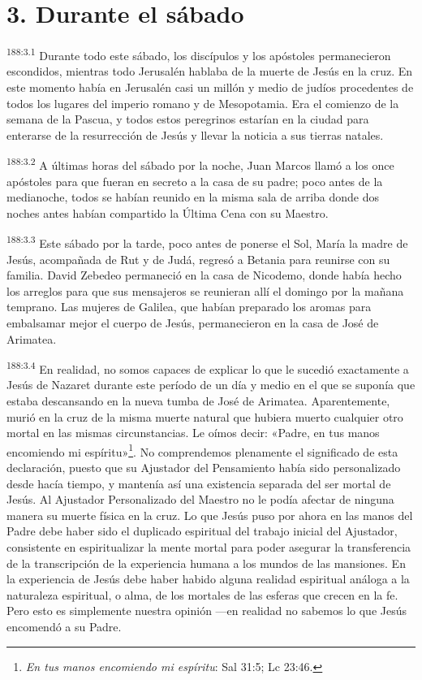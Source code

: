 \section*{3. Durante el sábado}
\par 
\textsuperscript{188:3.1} Durante todo este sábado, los discípulos y los apóstoles permanecieron escondidos, mientras todo Jerusalén hablaba de la muerte de Jesús en la cruz. En este momento había en Jerusalén casi un millón y medio de judíos procedentes de todos los lugares del imperio romano y de Mesopotamia. Era el comienzo de la semana de la Pascua, y todos estos peregrinos estarían en la ciudad para enterarse de la resurrección de Jesús y llevar la noticia a sus tierras natales.

\par 
\textsuperscript{188:3.2} A últimas horas del sábado por la noche, Juan Marcos llamó a los once apóstoles para que fueran en secreto a la casa de su padre; poco antes de la medianoche, todos se habían reunido en la misma sala de arriba donde dos noches antes habían compartido la Última Cena con su Maestro.

\par 
\textsuperscript{188:3.3} Este sábado por la tarde, poco antes de ponerse el Sol, María la madre de Jesús, acompañada de Rut y de Judá, regresó a Betania para reunirse con su familia. David Zebedeo permaneció en la casa de Nicodemo, donde había hecho los arreglos para que sus mensajeros se reunieran allí el domingo por la mañana temprano. Las mujeres de Galilea, que habían preparado los aromas para embalsamar mejor el cuerpo de Jesús, permanecieron en la casa de José de Arimatea.

\par 
\textsuperscript{188:3.4} En realidad, no somos capaces de explicar lo que le sucedió exactamente a Jesús de Nazaret durante este período de un día y medio en el que se suponía que estaba descansando en la nueva tumba de José de Arimatea. Aparentemente, murió en la cruz de la misma muerte natural que hubiera muerto cualquier otro mortal en las mismas circunstancias. Le oímos decir: «Padre, en tus manos encomiendo mi espíritu»\footnote{\textit{En tus manos encomiendo mi espíritu}: Sal 31:5; Lc 23:46.}. No comprendemos plenamente el significado de esta declaración, puesto que su Ajustador del Pensamiento había sido personalizado desde hacía tiempo, y mantenía así una existencia separada del ser mortal de Jesús. Al Ajustador Personalizado del Maestro no le podía afectar de ninguna manera su muerte física en la cruz. Lo que Jesús puso por ahora en las manos del Padre debe haber sido el duplicado espiritual del trabajo inicial del Ajustador, consistente en espiritualizar la mente mortal para poder asegurar la transferencia de la transcripción de la experiencia humana a los mundos de las mansiones. En la experiencia de Jesús debe haber habido alguna realidad espiritual análoga a la naturaleza espiritual, o alma, de los mortales de las esferas que crecen en la fe. Pero esto es simplemente nuestra opinión ---en realidad no sabemos lo que Jesús encomendó a su Padre.

